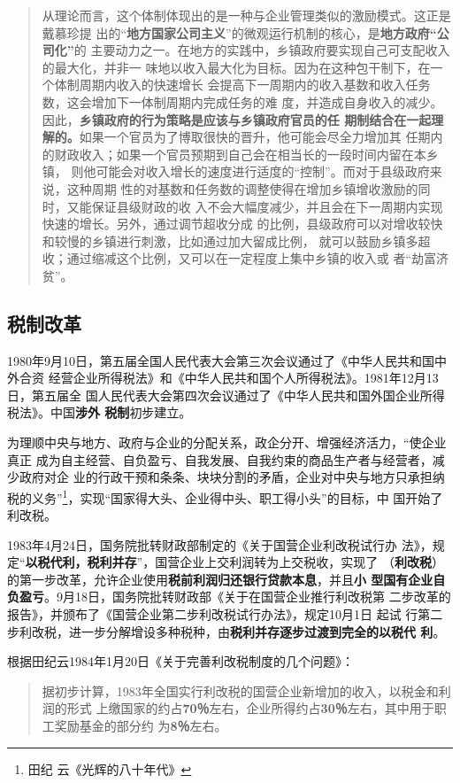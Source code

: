 \begin{quotation}
  从理论而言，这个体制体现出的是一种与企业管理类似的激励模式。这正是戴慕珍提
  出的“\textbf{地方国家公司主义}”的微观运行机制的核心，是\textbf{地方政府“公司化”}的
  主要动力之一。在地方的实践中，乡镇政府要实现自己可支配收入的最大化，并非一
  味地以收入最大化为目标。因为在这种包干制下，在一个体制周期内收入的快速增长
  会提高下一周期内的收入基数和收入任务数，这会增加下一体制周期内完成任务的难
  度，并造成自身收入的减少。因此，\textbf{乡镇政府的行为策略是应该与乡镇政府官员的任
  期制结合在一起理解的。}如果一个官员为了博取很快的晋升，他可能会尽全力增加其
  任期内的财政收入；如果一个官员预期到自己会在相当长的一段时间内留在本乡镇，
  则他可能会对收入增长的速度进行适度的“控制”。而对于县级政府来说，这种周期
  性的对基数和任务数的调整使得在增加乡镇增收激励的同时，又能保证县级财政的收
  入不会大幅度减少，并且会在下一周期内实现快速的增长。另外，通过调节超收分成
  的比例，县级政府可以对增收较快和较慢的乡镇进行刺激，比如通过加大留成比例，
  就可以鼓励乡镇多超收；通过缩减这个比例，又可以在一定程度上集中乡镇的收入或
  者“劫富济贫”。
\end{quotation}

\subsection{税制改革}

1980年9月10日，第五届全国人民代表大会第三次会议通过了《中华人民共和国中外合资
经营企业所得税法》和《中华人民共和国个人所得税法》。1981年12月13日，第五届全
国人民代表大会第四次会议通过了《中华人民共和国外国企业所得税法》。中国\textbf{涉外
  税制}初步建立。

为理顺中央与地方、政府与企业的分配关系，政企分开、增强经济活力，“使企业真正
成为自主经营、自负盈亏、自我发展、自我约束的商品生产者与经营者，减少政府对企
业的行政干预和条条、块块分割的矛盾，企业对中央与地方只承担纳税的义务”\footnote{田纪
  云《光辉的八十年代》}，实现“国家得大头、企业得中头、职工得小头”的目标，中
国开始了利改税。

1983年4月24日，国务院批转财政部制定的《关于国营企业利改税试行办
法》，规定“\textbf{以税代利，税利并存}”，国营企业上交利润转为上交税收，实现了
（\textbf{利改税}）的第一步改革，允许企业使用\textbf{税前利润归还银行贷款本息}，并且\textbf{小
  型国有企业自负盈亏}。9月18日，国务院批转财政部《关于在国营企业推行利改税第
二步改革的报告》，并颁布了《国营企业第二步利改税试行办法》，规定10月1日 起试
行第二步利改税，进一步分解增设多种税种，由\textbf{税利并存逐步过渡到完全的以税代
  利}。

根据田纪云1984年1月20日《关于完善利改税制度的几个问题》：
\begin{quotation}
  据初步计算，1983年全国实行利改税的国营企业新增加的收入，以税金和利润的形式
  上缴国家的约占\textbf{70％}左右，企业所得约占\textbf{30％}左右，其中用于职工奖励基金的部分约
  为\textbf{8％}左右。

\end{quotation}

